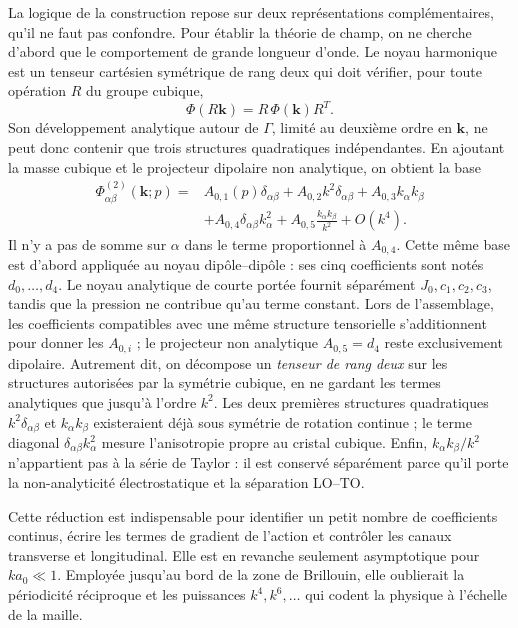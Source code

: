 La logique de la construction repose sur deux représentations complémentaires,
qu'il ne faut pas confondre. Pour établir la théorie de champ, on ne cherche
d'abord que le comportement de grande longueur d'onde. Le noyau harmonique est
un tenseur cartésien symétrique de rang deux qui doit vérifier, pour toute
opération $R$ du groupe cubique,
\begin{equation}
\Phi(R\mathbf k)=R\,\Phi(\mathbf k)R^T.
\label{eq:core_cubic_covariance_kernel}
\end{equation}
Son développement analytique autour de $\Gamma$, limité au deuxième ordre en
$\mathbf k$, ne peut donc contenir que trois structures quadratiques
indépendantes. En ajoutant la masse cubique et le projecteur dipolaire non
analytique, on obtient la base
\begin{equation}
\begin{aligned}
\Phi_{\alpha\beta}^{(2)}(\mathbf k;p)={}&
A_{0,1}(p)\delta_{\alpha\beta}
+A_{0,2}k^2\delta_{\alpha\beta}
+A_{0,3}k_\alpha k_\beta\\
&+A_{0,4}\delta_{\alpha\beta}k_\alpha^2
+A_{0,5}\frac{k_\alpha k_\beta}{k^2}+O(k^4).
\end{aligned}
\label{eq:core_cubic_rank_two_basis}
\end{equation}
Il n'y a pas de somme sur $\alpha$ dans le terme proportionnel à $A_{0,4}$.
Cette même base est d'abord appliquée au noyau dipôle--dipôle : ses cinq
coefficients sont notés $d_0,\ldots,d_4$. Le noyau analytique de courte portée
fournit séparément $J_0,c_1,c_2,c_3$, tandis que la pression ne contribue qu'au
terme constant. Lors de l'assemblage, les coefficients compatibles avec une
même structure tensorielle s'additionnent pour donner les $A_{0,i}$ ; le
projecteur non analytique $A_{0,5}=d_4$ reste exclusivement dipolaire.
Autrement dit, on décompose un \emph{tenseur de rang deux} sur les structures
autorisées par la symétrie cubique, en ne gardant les termes analytiques que
jusqu'à l'ordre $k^2$. Les deux premières structures quadratiques
$k^2\delta_{\alpha\beta}$ et $k_\alpha k_\beta$ existeraient déjà sous symétrie
de rotation continue ; le terme diagonal
$\delta_{\alpha\beta}k_\alpha^2$ mesure l'anisotropie propre au cristal cubique.
Enfin, $k_\alpha k_\beta/k^2$ n'appartient pas à la série de Taylor : il est
conservé séparément parce qu'il porte la non-analyticité électrostatique et la
séparation LO--TO.

Cette réduction est indispensable pour identifier un petit nombre de
coefficients continus, écrire les termes de gradient de l'action et contrôler
les canaux transverse et longitudinal. Elle est en revanche seulement
asymptotique pour $ka_0\ll1$. Employée jusqu'au bord de la zone de Brillouin,
elle oublierait la périodicité réciproque et les puissances $k^4,k^6,\ldots$
qui codent la physique à l'échelle de la maille.


